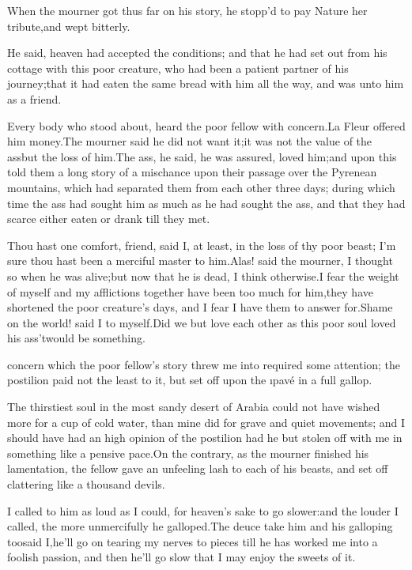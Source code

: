 \documentclass[twoside]{article}
\begin{document}
When the mourner got thus far on his story, he stopp’d to pay Nature her
tribute,\tsk and wept bitterly.

He said, heaven had accepted the conditions; and that he had set out from
his cottage with this poor creature, who had been a patient partner of
his journey;\tsk that it had eaten the same bread with him all the way, and
was unto him as a friend.

Every body who stood about, heard the poor fellow with concern.\tsk La Fleur
offered him money.\tsk The mourner said he did not want it;\tsk it was not the
value of the ass\tsk but the loss of him.\tsk The ass, he said, he was assured,
loved him;\tsk and upon this told them a long story of a mischance upon their
passage over the Pyrenean mountains, which had separated them from each
other three days; during which time the ass had sought him as much as he
had sought the ass, and that they had scarce either eaten or drank till
they met.

Thou hast one comfort, friend, said I, at least, in the loss of thy poor
beast; I’m sure thou hast been a merciful master to him.\tsk Alas! said the
mourner, I thought so when he was alive;\tsk but now that he is dead, I think
otherwise.\tsk I fear the weight of myself and my afflictions together have
been too much for him,\tsk they have shortened the poor creature’s days, and
I fear I have them to answer for.\tsk Shame on the world! said I to
myself.\tsk Did we but love each other as this poor soul loved his
ass\tsk ’twould be something.\tsk 






 concern which the poor fellow’s story threw me into required some
attention; the postilion paid not the least to it, but set off upon the
\i{pavé} in a full gallop.

The thirstiest soul in the most sandy desert of Arabia could not have
wished more for a cup of cold water, than mine did for grave and quiet
movements; and I should have had an high opinion of the postilion had he
but stolen off with me in something like a pensive pace.\tsk On the contrary,
as the mourner finished his lamentation, the fellow gave an unfeeling
lash to each of his beasts, and set off clattering like a thousand
devils.

I called to him as loud as I could, for heaven’s sake to go slower:\tsk and
the louder I called, the more unmercifully he galloped.\tsk The deuce take
him and his galloping too\tsk said I,\tsk he’ll go on tearing my nerves to pieces
till he has worked me into a foolish passion, and then he’ll go slow that
I may enjoy the sweets of it.
\end{document}
